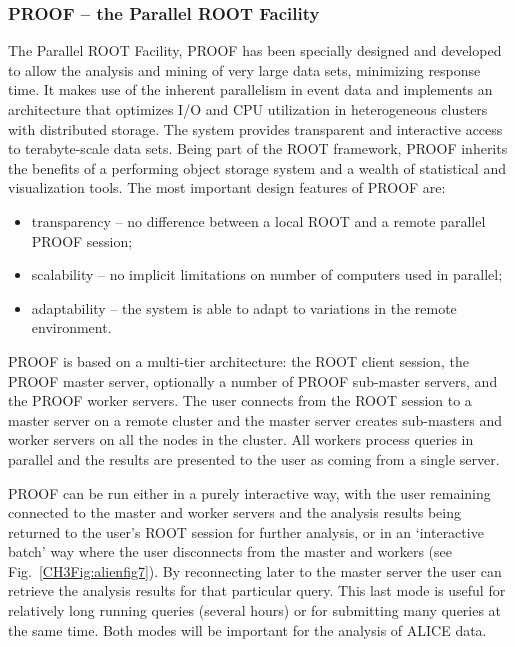 \documentclass[12pt,a4paper,twoside]{article}
\begin{document}
{\subsubsection{PROOF -- the Parallel ROOT Facility}

The Parallel ROOT Facility, PROOF\cite{CH6Ref:PROOF} has been specially
designed and developed 
to allow the analysis and mining of very large data sets, minimizing
response time. It makes use of the inherent parallelism in event data
and implements an architecture that optimizes I/O and CPU utilization
in heterogeneous clusters with distributed storage. The system
provides transparent and interactive access to terabyte-scale data
sets. Being part of the ROOT framework, PROOF inherits the benefits of
a performing object storage system and a wealth of statistical and
visualization tools. 
The most important design features of PROOF are:

\begin{itemize}
\item transparency -- no difference between a local ROOT and
  a remote parallel PROOF session; 
\item scalability -- no implicit limitations on number of computers
  used in parallel;
\item adaptability -- the system is able to adapt to variations in the
  remote environment.
\end{itemize}

PROOF is based on a multi-tier architecture: the ROOT client session,
the PROOF master server, optionally a number of PROOF sub-master
servers, and the PROOF worker servers. The user connects from the ROOT
session to a master server on a remote cluster and the master server
creates sub-masters and worker servers on all the nodes in the
cluster. All workers process queries in parallel and the results are
presented to the user as coming from a single server.

PROOF can be run either in a purely interactive way, with the user
remaining connected to the master and worker servers and the analysis
results being returned to the user's ROOT session for further
analysis, or in an `interactive batch' way where the user disconnects
from the master and workers (see Fig.~\vref{CH3Fig:alienfig7}). By
reconnecting later to the master server the user can retrieve the
analysis results for that particular 
query. This last mode is useful for relatively long running queries
(several hours) or for submitting many queries at the same time. Both
modes will be important for the analysis of ALICE data.

}
\end{document}
